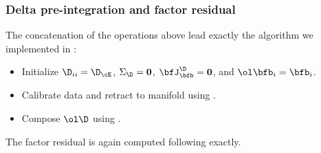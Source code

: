 




\subsubsection{Delta pre-integration and factor residual}

The concatenation of the operations above lead exactly the algorithm we implemented in \cite{fourmy2021contact}:
%
\begin{itemize}
    \item Initialize $\D_{ii} = \D_\cE$, $\Sigma_\D=\bf0$, $\bfJ^\D_\bfb = \bf0$, and $\ol\bfb_i = \bfb_i$.
    \item Calibrate data and retract to manifold using .
    \item Compose $\ol\D$ using .
\end{itemize}
%
The factor residual is again computed following  exactly.



